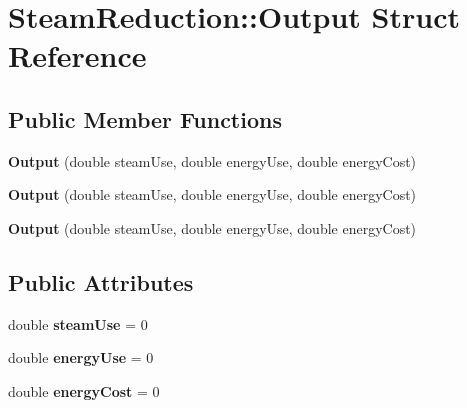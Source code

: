 \hypertarget{struct_steam_reduction_1_1_output}{}\section{Steam\+Reduction\+:\+:Output Struct Reference}
\label{struct_steam_reduction_1_1_output}
\subsection*{Public Member Functions}
\begin{DoxyCompactItemize}
\item 
\mbox{\label{struct_steam_reduction_1_1_output_a5efa299c9a35bfbdab08e02d404fb050}} 
{\bfseries Output} (double steam\+Use, double energy\+Use, double energy\+Cost)
\item 
\mbox{\label{struct_steam_reduction_1_1_output_a5efa299c9a35bfbdab08e02d404fb050}} 
{\bfseries Output} (double steam\+Use, double energy\+Use, double energy\+Cost)
\item 
\mbox{\label{struct_steam_reduction_1_1_output_a5efa299c9a35bfbdab08e02d404fb050}} 
{\bfseries Output} (double steam\+Use, double energy\+Use, double energy\+Cost)
\end{DoxyCompactItemize}
\subsection*{Public Attributes}
\begin{DoxyCompactItemize}
\item 
\mbox{\label{struct_steam_reduction_1_1_output_afe134295fab4c729093015f8588c734c}} 
double {\bfseries steam\+Use} = 0
\item 
\mbox{\label{struct_steam_reduction_1_1_output_a73e99eac2e58231d456cfc5127ca9288}} 
double {\bfseries energy\+Use} = 0
\item 
\mbox{\label{struct_steam_reduction_1_1_output_ad3096025f249842e2175ec75553e9b3c}} 
double {\bfseries energy\+Cost} = 0
\end{DoxyCompactItemize}


